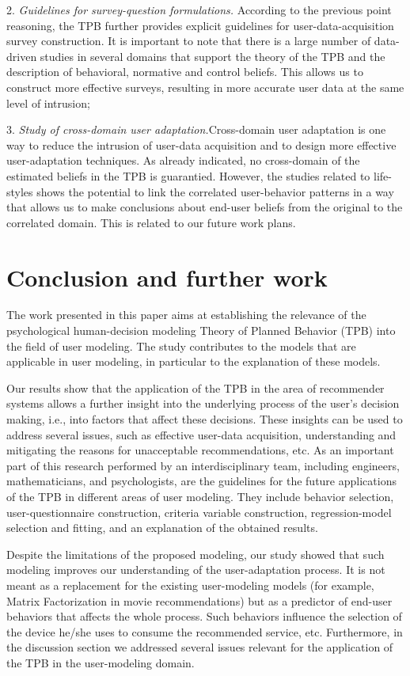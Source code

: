 \documentclass{llncs}
\begin{document}
2. {\it Guidelines for survey-question formulations.} According to the previous point reasoning, the TPB further provides explicit guidelines for user-data-acquisition survey construction. It is important to note that there is a large number of data-driven studies in several domains that support the theory of the TPB and the description of behavioral, normative and control beliefs. This allows us to construct more effective surveys, resulting in more accurate user data at the same level of intrusion;  

3.  {\it Study of cross-domain user adaptation.}Cross-domain user adaptation is one way to reduce the intrusion of user-data acquisition and to design more effective user-adaptation techniques. As already indicated, no cross-domain of the estimated beliefs in the TPB is guarantied. However, the studies related to life-styles shows the potential to link the correlated user-behavior patterns in a way that allows us to make conclusions about end-user beliefs from the original to the correlated domain. This is related to our future work plans.


\section{Conclusion and further work}\label{Sec_ConcAndFW}

The work presented in this paper aims at establishing the relevance of the psychological human-decision modeling Theory of Planned Behavior (TPB) into the field of user modeling. The study contributes to the models that are applicable in user modeling, in particular to the explanation of these models.

Our results show that the application of the TPB in the area of recommender systems allows a further insight into the underlying process of the user’s decision making, i.e., into factors that affect these decisions. These insights can be used to address several issues, such as effective user-data acquisition, understanding and mitigating the reasons for unacceptable recommendations, etc. As an important part of this research performed by an interdisciplinary team, including engineers, mathematicians, and psychologists, are the guidelines for the future applications of the TPB in different areas of user modeling. They include behavior selection, user-questionnaire construction, criteria variable construction, regression-model selection and fitting, and an explanation of the obtained results.

Despite the limitations of the proposed modeling, our study showed that such modeling improves our understanding of the user-adaptation process. It is not meant as a replacement for the existing user-modeling models (for example, Matrix Factorization in movie recommendations) but as a predictor of end-user behaviors that affects the whole process. Such behaviors influence the selection of the device he/she uses to consume the recommended service, etc. Furthermore, in the discussion section we addressed several issues relevant for the application of the TPB in the user-modeling domain.
\end{document}

